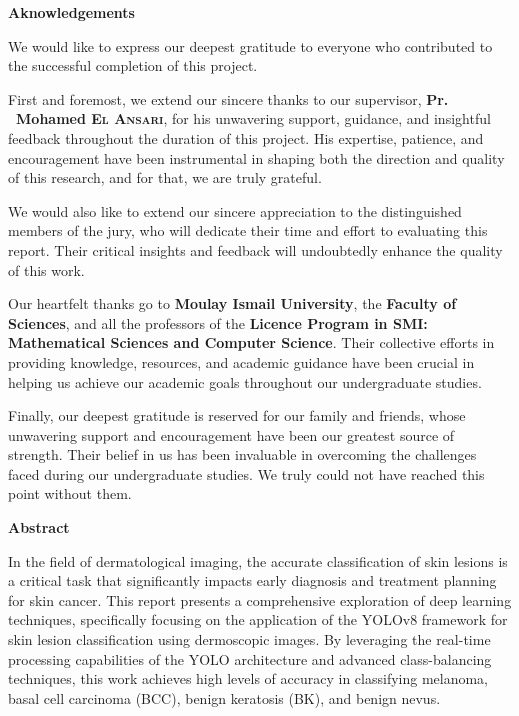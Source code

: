 \documentclass[a4paper,12pt]{report}
\begin{document}
\newpage
\begin{spacing}{1.5}
     \begin{center}
         \textbf{\huge Aknowledgements}
     \end{center}

    We would like to express our deepest gratitude to everyone who contributed to the successful completion of this project.

    First and foremost, we extend our sincere thanks to our supervisor, \textbf{Pr. ~Mohamed \textsc{El Ansari}}, for his unwavering support, guidance, and insightful feedback throughout the duration of this project. His expertise, patience, and encouragement have been instrumental in shaping both the direction and quality of this research, and for that, we are truly grateful.

    We would also like to extend our sincere appreciation to the distinguished members of the jury, who will dedicate their time and effort to evaluating this report. Their critical insights and feedback will undoubtedly enhance the quality of this work.

    Our  heartfelt thanks go to \textbf{Moulay Ismail University}, the \textbf{Faculty of Sciences}, and all the professors of the \textbf{Licence Program in SMI: Mathematical Sciences and Computer Science}. Their collective efforts in providing knowledge, resources, and academic guidance have been crucial in helping us achieve our academic goals throughout our undergraduate studies.

    Finally, our deepest gratitude is reserved for our family and friends, whose unwavering support and encouragement have been our greatest source of strength. Their belief in us has been invaluable in overcoming the challenges faced during our undergraduate studies. We truly could not have reached this point without them.

\newpage
\begin{center}
    \textbf{\huge Abstract}
\end{center}

    In the field of dermatological imaging, the accurate classification of skin lesions is a critical task that significantly impacts early diagnosis and treatment planning for skin cancer. This report presents a comprehensive exploration of deep learning techniques, specifically focusing on the application of the YOLOv8 framework for skin lesion classification using dermoscopic images. By leveraging the real-time processing capabilities of the YOLO architecture and advanced class-balancing techniques, this work achieves high levels of accuracy in classifying melanoma, basal cell carcinoma (BCC), benign keratosis (BK), and benign nevus.


\end{spacing}
\end{document}
